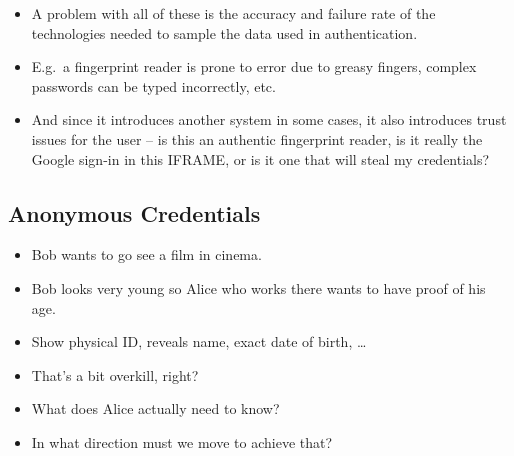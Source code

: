 \begin{frame}
  \begin{itemize}
    \item A problem with all of these is the accuracy and failure rate of the 
      technologies needed to sample the data used in authentication.

    \item E.g.\ a fingerprint reader is prone to error due to greasy fingers, 
      complex passwords can be typed incorrectly, etc.

    \item And since it introduces another system in some cases, it also 
      introduces trust issues for the user -- is this an authentic fingerprint 
      reader, is it really the Google sign-in in this IFRAME, or is it one that 
      will steal my credentials?

  \end{itemize}
\end{frame}


\subsection{Anonymous Credentials}

\begin{frame}
  \begin{example}
    \begin{itemize}
      \item Bob wants to go see a film in cinema.
      \item Bob looks very young so Alice who works there wants to have proof 
        of his age.

        \pause{}

      \item Show physical ID, reveals name, exact date of birth, \dots
    \end{itemize}
  \end{example}

  \pause{}

  \begin{exercise}
    \begin{itemize}
      \item That's a bit overkill, right?
      \item What does Alice actually need to know?
      \item In what direction must we move to achieve that?
    \end{itemize}
  \end{exercise}
\end{frame}

